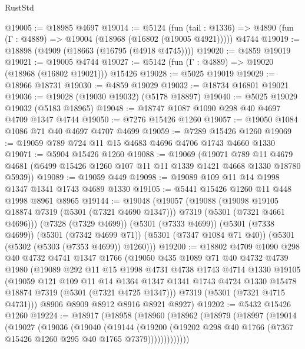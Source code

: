 \begin{lexlean}{RustStd}
\begin{coremodule}
@19005 := @18985 @4697
@19014 := @5124
    (fun (tail : @1336) => @4890 (fun (Γ : @4889) => @19004 (@18968 (@16802 (@19005 @4921)))))
    @4744
@19019 := @18898 (@4909 (@18663 (@16795 (@4918 @4745))))
@19020 := @4859 @19019
@19021 := @19005 @4744
@19027 := @5142 (fun (Γ : @4889) => @19020 (@18968 (@16802 @19021))) @15426
@19028 := @5025 @19019
@19029 := @18966 @18731
@19030 := @4859 @19029
@19032 := @18734 @16801 @19021
@19036 := @19028 (@19030 @19032) (@5178 @18897)
@19040 := @5025 @19029 @19032 (@5183 @18965)
@19048 := @18747 @1087 @1090 @298 @40 @4697 @4709 @1347 @4744
@19050 := @7276 @15426 @1260
@19057 := @19050 @1084 @1086 @71 @40 @4697 @4707 @4699
@19059 := @7289 @15426 @1260
@19069 := @19059 @789 @724 @11 @15 @4683 @4696 @4706 @1743 @4660 @1330
@19071 := @5904 @15426 @1260
@19088 := @19069
    (@19071
      @789
      @11
      @4679
      @4681
      (@6499 @15426 @1260 @107 @11 @11 @1339 @1421 @4668 @1330 @18780 @5939))
@19089 := @19059 @449
@19098 := @19089 @109 @11 @14 @1998 @1347 @1341 @1743 @4689 @1330
@19105 := @5441 @15426 @1260 @11 @448 @1998 @8961 @8965
@19144 := @19048
    (@19057
      (@19088
        (@19098 @19105 @18874 @7319 (@5301 (@7321 @4690 @1347)))
        @7319
        (@5301 (@7321 @4661 @4696)))
      (@7328 (@7329 @4699))
      (@5301 (@7333 @4699))
      (@5301 (@7338 @4699))
      (@5301 (@7342 @4699 @71))
      (@5301 (@7347 @1084 @71 @40))
      (@5301 (@5302 (@5303 (@7353 @4699)) @1260)))
@19200 := @18802
    @4709
    @1090
    @298
    @40
    @4732
    @4741
    @1347
    @1766
    (@19050
      @435
      @1089
      @71
      @40
      @4732
      @4739
      @1980
      (@19089
        @292
        @11
        @15
        @1998
        @4731
        @4738
        @1743
        @4714
        @1330
        @19105
        (@19059
          @121
          @109
          @11
          @14
          @1364
          @1347
          @1341
          @1743
          @4724
          @1330
          @15478
          @18874
          @7319
          (@5301 (@7321 @4725 @1347)))
        @7319
        (@5301 (@7321 @4715 @4731)))
      @8906
      @8909
      @8912
      @8916
      @8921
      @8927)
@19202 := @5432 @15426 @1260
@19224 := @18917
    (@18958
      (@18960
        (@18962
          (@18979
            (@18997
              (@19014
                (@19027
                  (@19036
                    (@19040
                      (@19144
                        (@19200
                          (@19202
                            @298
                            @40
                            @1766
                            (@7367 @15426 @1260 @295 @40 @1765 @7379)))))))))))))

\end{coremodule}
\end{lexlean}
